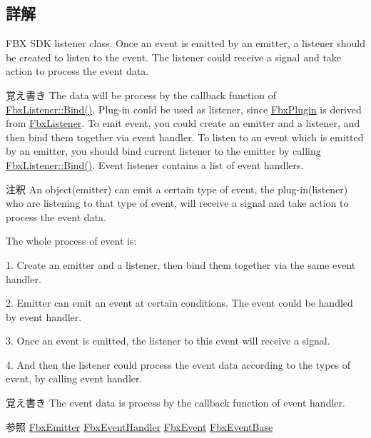 \subsection{詳解}
F\+BX S\+DK listener class. Once an event is emitted by an emitter, a listener should be created to listen to the event. The listener could receive a signal and take action to process the event data. \begin{DoxyNote}{覚え書き}
The data will be process by the callback function of \hyperlink{class_fbx_listener_a7a3298b1f4fa347aaa2cb5136265a178}{Fbx\+Listener\+::\+Bind()}. Plug-\/in could be used as listener, since \hyperlink{class_fbx_plugin}{Fbx\+Plugin} is derived from \hyperlink{class_fbx_listener}{Fbx\+Listener}. To emit event, you could create an emitter and a listener, and then bind them together via event handler. To listen to an event which is emitted by an emitter, you should bind current listener to the emitter by calling \hyperlink{class_fbx_listener_a7a3298b1f4fa347aaa2cb5136265a178}{Fbx\+Listener\+::\+Bind()}. Event listener contains a list of event handlers. 
\end{DoxyNote}
\begin{DoxyRemark}{注釈}
An object(emitter) can emit a certain type of event, the plug-\/in(listener) who are listening to that type of event, will receive a signal and take action to process the event data. 
\end{DoxyRemark}
\begin{DoxyParagraph}{The whole process of event is\+:}
\begin{DoxyItemize}
\item 1. Create an emitter and a listener, then bind them together via the same event handler. \item 2. Emitter can emit an event at certain conditions. The event could be handled by event handler. \item 3. Once an event is emitted, the listener to this event will receive a signal. \item 4. And then the listener could process the event data according to the types of event, by calling event handler. \end{DoxyItemize}

\end{DoxyParagraph}
\begin{DoxyNote}{覚え書き}
The event data is process by the callback function of event handler. 
\end{DoxyNote}
\begin{DoxySeeAlso}{参照}
\hyperlink{class_fbx_emitter}{Fbx\+Emitter} \hyperlink{class_fbx_event_handler}{Fbx\+Event\+Handler} \hyperlink{class_fbx_event}{Fbx\+Event} \hyperlink{class_fbx_event_base}{Fbx\+Event\+Base} 
\end{DoxySeeAlso}


